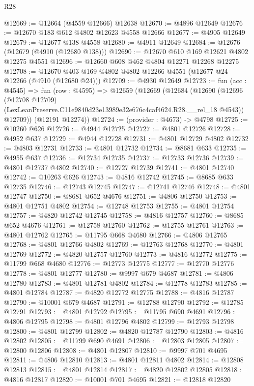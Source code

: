 \begin{lexlean}{R28}
\begin{coremodule}
@12669 := @12664 (@4559 @12666) @12638
@12670 := @4896 @12649
@12676 := @12670 @183 @612 @4802 @12623 @4558 @12666
@12677 := @4905 @12649
@12679 := @12677 @138 @4558
@12680 := @4911 @12649
@12684 := @12676 (@12679 (@4910 (@12680 @138)))
@12690 := @12670 @610 @169 @12621 @4802 @12275 @4551
@12696 := @12660 @608 @462 @4804 @12271 @12268 @12275
@12708 := @12670 @403 @169 @4802 @4802 @12266 @4551 (@12677 @24 @12266 (@4910 (@12680 @24)))
@12709 := @4930 @12649
@12723 := fun (acc : @4545) =>
  fun (row : @4595) =>
  @12659
    (@12669
      (@12684
        (@12690
          (@12696
            (@12708 @12709)
            (LexLeanPreserve.C11e9840d23e13989e32e676c4caf4624.R28.__rel_18 @4543))
          @12709))
      (@12191 @12274))
@12724 := (provider : @4673) -> @4798
@12725 := @10260 @626
@12726 := @4944 @12725
@12727 := @4801 @12726
@12728 := @4952 @637
@12729 := @4944 @12728
@12731 := @4801 @12729 @4802
@12732 := @4803 @12731
@12733 := @4801 @12732
@12734 := @8681 @633
@12735 := @4955 @637
@12736 := @12734 @12735
@12737 := @12733 @12736
@12739 := @4801 @12737 @4802
@12740 := @12727 @12739
@12741 := @4801 @12740
@12742 := @10263 @626
@12743 := @4816 @12742
@12745 := @8685 @633 @12735
@12746 := @12743 @12745
@12747 := @12741 @12746
@12748 := @4801 @12747
@12750 := @8681 @652 @4676
@12751 := @4806 @12750
@12753 := @4801 @12751 @4802
@12754 := @12748 @12753
@12755 := @4801 @12754
@12757 := @4820 @12742 @12745
@12758 := @4816 @12757
@12760 := @8685 @652 @4676
@12761 := @12758 @12760
@12762 := @12755 @12761
@12763 := @4801 @12762
@12765 := @11795 @668 @4680
@12766 := @4806 @12765
@12768 := @4801 @12766 @4802
@12769 := @12763 @12768
@12770 := @4801 @12769
@12772 := @4820 @12757 @12760
@12773 := @4816 @12772
@12775 := @11799 @668 @4680
@12776 := @12773 @12775
@12777 := @12770 @12776
@12778 := @4801 @12777
@12780 := @9997 @679 @4687
@12781 := @4806 @12780
@12783 := @4801 @12781 @4802
@12784 := @12778 @12783
@12785 := @4801 @12784
@12787 := @4820 @12772 @12775
@12788 := @4816 @12787
@12790 := @10001 @679 @4687
@12791 := @12788 @12790
@12792 := @12785 @12791
@12793 := @4801 @12792
@12795 := @11795 @690 @4691
@12796 := @4806 @12795
@12798 := @4801 @12796 @4802
@12799 := @12793 @12798
@12800 := @4801 @12799
@12802 := @4820 @12787 @12790
@12803 := @4816 @12802
@12805 := @11799 @690 @4691
@12806 := @12803 @12805
@12807 := @12800 @12806
@12808 := @4801 @12807
@12810 := @9997 @701 @4695
@12811 := @4806 @12810
@12813 := @4801 @12811 @4802
@12814 := @12808 @12813
@12815 := @4801 @12814
@12817 := @4820 @12802 @12805
@12818 := @4816 @12817
@12820 := @10001 @701 @4695
@12821 := @12818 @12820

\end{coremodule}
\end{lexlean}
